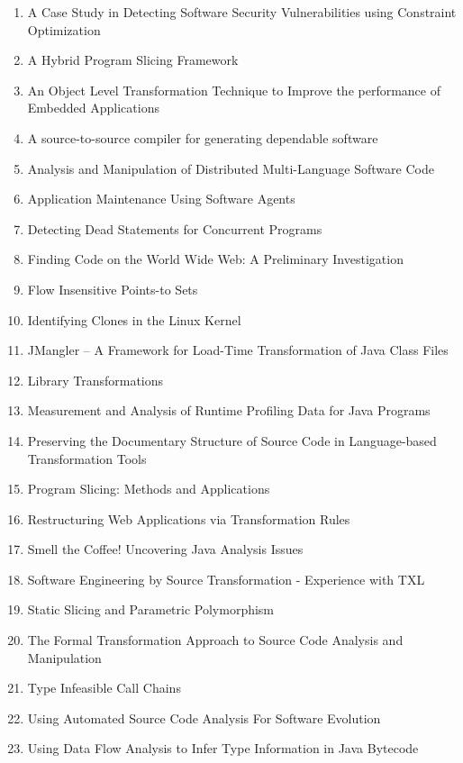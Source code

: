 \begin{enumerate}[itemsep=-1ex]
  \item A Case Study in Detecting Software Security Vulnerabilities using Constraint Optimization
  \item A Hybrid Program Slicing Framework
  \item An Object Level Transformation Technique to Improve the performance of Embedded Applications
  \item A source-to-source compiler for generating dependable software
  \item Analysis and Manipulation of Distributed Multi-Language Software Code
  \item Application Maintenance Using Software Agents
  \item Detecting Dead Statements for Concurrent Programs
  \item Finding Code on the World Wide Web: A Preliminary Investigation
  \item Flow Insensitive Points-to Sets
  \item Identifying Clones in the Linux Kernel
  \item JMangler – A Framework for Load-Time Transformation of Java Class Files
  \item Library Transformations
  \item Measurement and Analysis of Runtime Profiling Data for Java Programs
  \item Preserving the Documentary Structure of Source Code in Language-based Transformation Tools
  \item Program Slicing: Methods and Applications
  \item Restructuring Web Applications via Transformation Rules
  \item Smell the Coffee! Uncovering Java Analysis Issues
  \item Software Engineering by Source Transformation - Experience with TXL
  \item Static Slicing and Parametric Polymorphism
  \item The Formal Transformation Approach to Source Code Analysis and Manipulation
  \item Type Infeasible Call Chains
  \item Using Automated Source Code Analysis For Software Evolution
  \item Using Data Flow Analysis to Infer Type Information in Java Bytecode
\end{enumerate}

